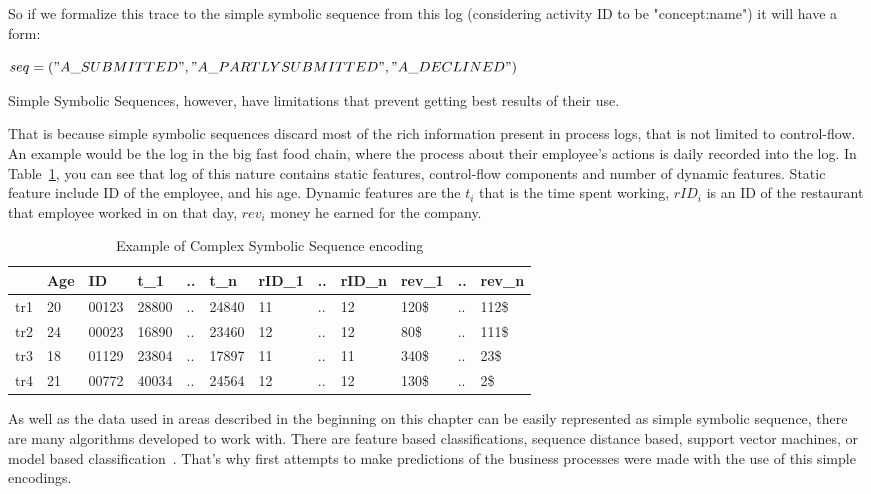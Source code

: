 So if we formalize this trace to the simple symbolic sequence from this log (considering activity ID to be "concept:name") it will have a form:

$seq = ("A\_SUBMITTED","A\_PARTLYSUBMITTED","A\_DECLINED")$

Simple Symbolic Sequences, however, have limitations that prevent getting best results of their use.

That is because simple symbolic sequences discard most of the rich information present in process logs, that is not limited to control-flow. An example would be the log in the big fast food chain, where the process about their employee's actions is daily recorded into the log. In Table~\ref{tab:statements}, you can see that log of this nature contains static features, control-flow components and number of dynamic features. Static feature include ID of the employee, and his age. Dynamic features are the $t_i$ that is the time spent working, $rID_i$ is an ID of the restaurant that employee worked in on that day, $rev_i$ money he earned for the company. 

\begin{table}[h]
	\centering
	\begin{tabular}{| l | l | l | l | l | l | l | l | l | l | l | l |}
		\hline
		& Age & ID & t\_1 & .. & t\_n & rID\_1 & .. & rID\_n & rev\_1 & .. & rev\_n \\	
		\hline
		tr1 & 20 & 00123 & 28800 & .. & 24840 & 11 & .. & 12 & 120\$ & .. & 112\$ \\
		tr2 & 24 & 00023 & 16890 & .. & 23460 & 12 & .. & 12 & 80\$ & .. & 111\$ \\
		tr3 & 18 & 01129 & 23804 & .. & 17897 & 11 & .. & 11 & 340\$ & .. & 23\$ \\
		tr4 & 21 & 00772 & 40034 & .. & 24564 & 12 & .. & 12 & 130\$ & .. & 2\$ \\
		\hline
	\end{tabular}
	\caption{Example of Complex Symbolic Sequence encoding}
	\label{tab:statements}
\end{table}


As well as the data used in areas described in the beginning on this chapter can be easily represented as simple symbolic sequence, there are many algorithms developed to work with. There are feature based classifications, sequence distance based, support vector machines, or model based classification~\cite{Xing:2010:BSS:1882471.1882478}. That's why first attempts to make predictions of the business processes were made with the use of this simple encodings.



